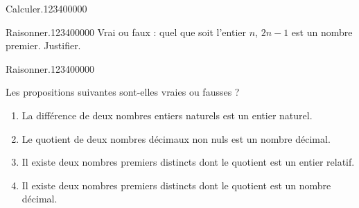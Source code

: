 \begin{pageAD}
\begin{ExoCad}{Calculer.}{1234}{0}{0}{0}{0}{0}

\end{ExoCad}



\begin{ExoCad}{Raisonner.}{1234}{0}{0}{0}{0}{0}
Vrai ou faux : quel que soit l'entier $n$, $2n-1$ est un nombre premier. Justifier.
\end{ExoCad}


 
\begin{ExoCad}{Raisonner.}{1234}{0}{0}{0}{0}{0}

Les propositions suivantes sont-elles vraies ou fausses ?
\begin{enumerate}[leftmargin=*]
\item La différence de deux nombres entiers naturels est un entier naturel. 
\item Le quotient de deux nombres décimaux non nuls est un nombre décimal.  
\item Il existe deux nombres premiers distincts dont le quotient est un
  entier relatif. 
\item Il existe deux nombres premiers distincts dont le quotient est un
  nombre décimal. 
\end{enumerate} 
 
 \end{ExoCad}
 
\end{pageAD}


